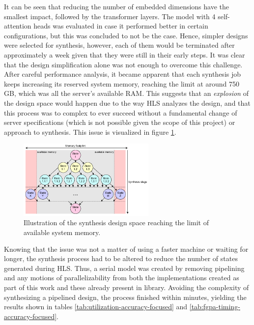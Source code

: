 It can be seen that reducing the number of embedded dimensions have the smallest impact, followed by the transformer layers. The model with 4 self-attention heads was evaluated in case it performed better in certain configurations, but this was concluded to not be the case. Hence, simpler designs were selected for synthesis, however, each of them would be terminated after approximately a week given that they were still in their early steps. It was clear that the design simplification alone was not enough to overcome this challenge. After careful performance analysis, it became apparent that each synthesis job keeps increasing its reserved system memory, reaching the limit at around 750 GB, which was all the server's available RAM. This suggests that an \textit{explosion} of the design space would happen due to the way HLS analyzes the design, and that this process was to complex to ever succeed without a fundamental change of server specifications (which is not possible given the scope of this project) or approach to synthesis. This issue is visualized in figure \ref{fig:state-space-explosion}. 

\begin{figure}[hpt!]
  \centering
  \includegraphics[trim={0cm 0cm 0cm 0cm}, clip, width=0.6\textwidth, center]{evaluation/state_space_explosion.pdf}
  \caption{Illustration of the synthesis design space reaching the limit of available system memory.}
  \label{fig:state-space-explosion}
\end{figure}

Knowing that the issue was not a matter of using a faster machine or waiting for longer, the synthesis process had to be altered to reduce the number of states generated during HLS. Thus, a serial model was created by removing pipelining and any motions of parallelizability from both the implementations created as part of this work and these already present in \hlsml library. Avoiding the complexity of synthesizing a pipelined design, the process finished within minutes, yielding the results shown in tables \ref{tab:utilization-accuracy-focused} and \ref{tab:fgpa-timing-accuracy-focused}.

